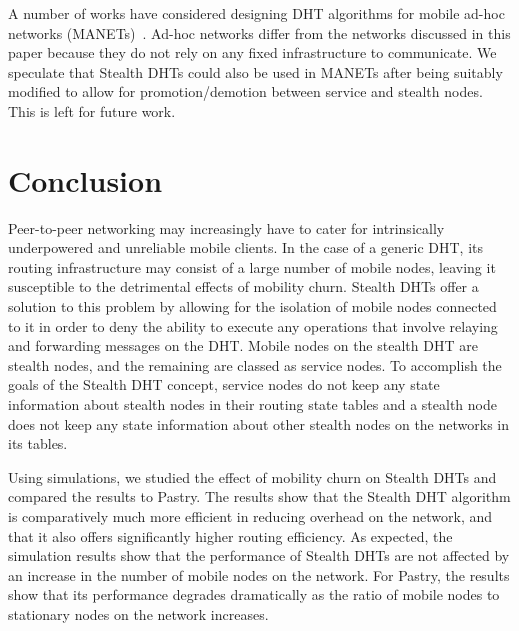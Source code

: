 \documentclass[conference]{IEEEtran}
\begin{document}
A number of works have considered designing DHT algorithms for
mobile ad-hoc networks (MANETs)~\cite{dhtmanet01}\cite{ekta}. Ad-hoc
networks differ from the networks discussed in this paper because
they do not rely on any fixed infrastructure to communicate. We
speculate that Stealth DHTs could also be used in MANETs after being
suitably modified to allow for promotion/demotion between service
and stealth nodes. This is left for future work.

\section{Conclusion}
\label{conclusion} Peer-to-peer networking may increasingly have to
cater for intrinsically underpowered and unreliable mobile clients.
In the case of a generic DHT, its routing infrastructure may consist
of a large number of mobile nodes, leaving it susceptible to the
detrimental effects of mobility churn. Stealth DHTs offer a solution
to this problem by allowing for the isolation of mobile nodes
connected to it in order to deny the ability to execute any
operations that involve relaying and forwarding messages on the DHT.
Mobile nodes on the stealth DHT are stealth nodes, and the remaining
are classed as service nodes. To accomplish the goals of the Stealth
DHT concept, service nodes do not keep any state information about
stealth nodes in their routing state tables and a stealth node does
not keep any state information about other stealth nodes on the
networks in its tables.

Using simulations, we studied the effect of mobility churn on
Stealth DHTs and compared the results to Pastry. The results show
that the Stealth DHT algorithm is comparatively much more efficient
in reducing overhead on the network, and that it also offers
significantly higher routing efficiency. As expected, the simulation
results show that the performance of Stealth DHTs are not affected
by an increase in the number of mobile nodes on the network. For
Pastry, the results show that its performance degrades dramatically
as the ratio of mobile nodes to stationary nodes on the network
increases.




\end{document}
